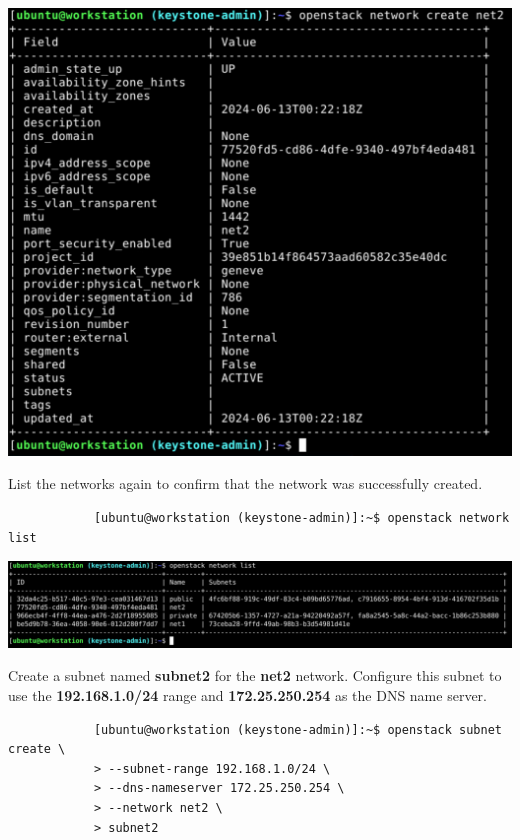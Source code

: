 \documentclass[letterpaper, 12pt]{article}
\begin{document}
\begin{enumerate}
\begin{labstep}
        \begin{center}
            \includegraphics[width=\linewidth]{images/part3/step11.png}
        \end{center}
    \end{labstep}

    \begin{labstep}
        List the networks again to confirm that the network was successfully created.
        \begin{lstlisting}
            [ubuntu@workstation (keystone-admin)]:~$ openstack network list
        \end{lstlisting}

        \begin{center}
            \includegraphics[width=\linewidth]{images/part3/step12.png}
        \end{center}
    \end{labstep}

    \begin{labstep}
        Create a subnet named \textbf{subnet2} for the \textbf{net2} network.
        Configure this subnet to use the \textbf{192.168.1.0/24} range and \textbf{172.25.250.254} as the DNS name server.
        \begin{lstlisting}
            [ubuntu@workstation (keystone-admin)]:~$ openstack subnet create \
            > --subnet-range 192.168.1.0/24 \
            > --dns-nameserver 172.25.250.254 \
            > --network net2 \
            > subnet2
        \end{lstlisting}


\end{labstep}
\end{enumerate}
\end{document}
